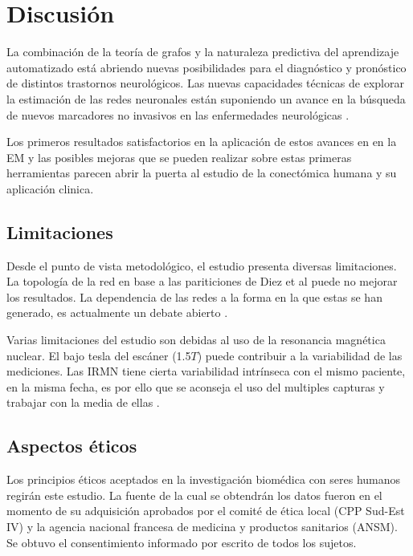 \documentclass[fleqn,12pt]{uicarticle} %
\begin{document}
\section{Discusión}

La combinación de la teoría de grafos y la naturaleza predictiva del aprendizaje automatizado está abriendo nuevas posibilidades para el diagnóstico y pronóstico de distintos trastornos neurológicos. Las nuevas capacidades técnicas de explorar la estimación de las redes neuronales están suponiendo un avance en la búsqueda de nuevos marcadores no invasivos en las enfermedades neurológicas \cite{Tymofiyeva2017,Fornito2015,Sun2016}.

Los primeros resultados satisfactorios en la aplicación de estos avances en en la EM \cite{Kocevar2016,Muthuraman2016} y las posibles mejoras que se pueden realizar sobre estas primeras herramientas parecen abrir la puerta al estudio de la conectómica humana y su aplicación clinica.

\subsection{Limitaciones}

Desde el punto de vista metodológico, el estudio presenta diversas limitaciones. La topología de la red en base a las pariticiones de Diez et al puede no mejorar los resultados. La dependencia de las redes a la forma en la que estas se han generado, es actualmente un debate abierto \cite{Zalesky2010}. 

Varias limitaciones del estudio son debidas al uso de la resonancia magnética nuclear. El bajo tesla del escáner (1.5$T$) puede contribuir a la variabilidad de las mediciones. Las IRMN tiene cierta variabilidad intrínseca con el mismo paciente, en la misma fecha, es por ello que se aconseja el uso del multiples capturas y trabajar con la media de ellas \cite{Landman2007}.

\subsection{Aspectos éticos}

Los principios éticos aceptados en la investigación biomédica con seres humanos regirán este estudio. La fuente de la cual se obtendrán los datos fueron en el momento de su adquisición aprobados por el comité de ética local (CPP Sud-Est IV) y la agencia nacional francesa de medicina y productos sanitarios (ANSM). Se obtuvo el consentimiento informado por escrito de todos los sujetos.
\end{document}
